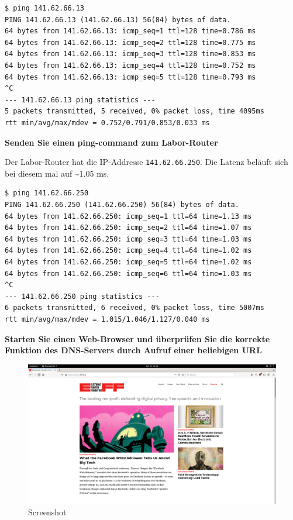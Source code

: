 \begin{verbatim}
$ ping 141.62.66.13
PING 141.62.66.13 (141.62.66.13) 56(84) bytes of data.
64 bytes from 141.62.66.13: icmp_seq=1 ttl=128 time=0.786 ms
64 bytes from 141.62.66.13: icmp_seq=2 ttl=128 time=0.775 ms
64 bytes from 141.62.66.13: icmp_seq=3 ttl=128 time=0.853 ms
64 bytes from 141.62.66.13: icmp_seq=4 ttl=128 time=0.752 ms
64 bytes from 141.62.66.13: icmp_seq=5 ttl=128 time=0.793 ms
^C
--- 141.62.66.13 ping statistics ---
5 packets transmitted, 5 received, 0% packet loss, time 4095ms
rtt min/avg/max/mdev = 0.752/0.791/0.853/0.033 ms
\end{verbatim}

\textbf{Senden Sie einen ping-command zum Labor-Router}

Der Labor-Router hat die IP-Addresse \texttt{141.62.66.250}. Die Latenz
beläuft sich bei diesem mal auf \textasciitilde1.05 ms.

\begin{verbatim}
$ ping 141.62.66.250
PING 141.62.66.250 (141.62.66.250) 56(84) bytes of data.
64 bytes from 141.62.66.250: icmp_seq=1 ttl=64 time=1.13 ms
64 bytes from 141.62.66.250: icmp_seq=2 ttl=64 time=1.07 ms
64 bytes from 141.62.66.250: icmp_seq=3 ttl=64 time=1.03 ms
64 bytes from 141.62.66.250: icmp_seq=4 ttl=64 time=1.02 ms
64 bytes from 141.62.66.250: icmp_seq=5 ttl=64 time=1.02 ms
64 bytes from 141.62.66.250: icmp_seq=6 ttl=64 time=1.03 ms
^C
--- 141.62.66.250 ping statistics ---
6 packets transmitted, 6 received, 0% packet loss, time 5007ms
rtt min/avg/max/mdev = 1.015/1.046/1.127/0.040 ms
\end{verbatim}

\textbf{Starten Sie einen Web-Browser und überprüfen Sie die korrekte
Funktion des DNS-Servers durch Aufruf einer beliebigen URL}

\begin{figure}
\centering
\includegraphics{./static/screenshot.png}
\caption{Screenshot}
\end{figure}

